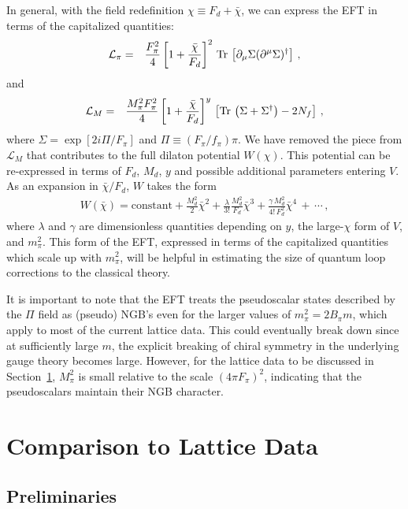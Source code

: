\documentclass[a4paper,11pt]{article}
\newcommand{\beqs}{\begin{eqnarray}}
\newcommand{\eeqs}{\end{eqnarray}}
\newcommand{\Tr}{{\rm Tr}}
\def\Tr{{\rm Tr \,}}                                    %
\begin{document}
In general, with the field redefinition $\chi \equiv F_d + \bar{\chi}$, we can express the EFT in terms of the capitalized quantities:
\beqs 
{\cal L}_{\pi}&=&\frac{F_{\pi}^2}{4}\left[ 1+ \frac{\bar{\chi}}{F_{d}}\right]^2 \,\Tr\left[\partial_\mu \Sigma (\partial^{\mu} \Sigma)^{\dagger}\right]\,,
\label{Eq:LpiR} 
\eeqs
and
\beqs
{\cal L}_M&=&\frac{M_{\pi}^{2}F_{\pi}^2}{4}\left[1+ \frac{\bar{\chi}}{F_{d}}\right]^y\, \left[\Tr \left(\Sigma + \Sigma^{\dagger}\right) - 2N_f \right] \,,\label{Eq:LMR}
\eeqs
where $\Sigma=\exp\left[2i \Pi/F_{\pi} \right]$ and $\Pi\equiv(F_\pi/f_\pi)\pi$. We have removed the piece from $\mathcal{L}_M$ that contributes to the full dilaton potential $W(\chi)$. This potential can be re-expressed in terms of $F_d$, $M_d$, $y$ and possible additional parameters entering $V$. As an expansion in $\bar{\chi} / F_d$, $W$  takes the form 
\beqs
W(\bar{\chi}) = \text{constant} + \frac{M_d^2}{2} \bar{\chi}^2 + \frac{\lambda}{3!} \frac{M_d^2}{F_d} \bar{\chi}^3 + \frac{\gamma \, M_d^2}{4!\,F_d^2}\bar{\chi}^4\,+\,\cdots \,,
\label{Eq:Wexpansion}
\eeqs
where $\lambda$ and $\gamma$ are dimensionless quantities depending on $y$, the large-$\chi$ form of $V$, and $m_{\pi}^2$. This form of the EFT, expressed in terms of the capitalized quantities which scale up with $m_{\pi}^2$, will be helpful in estimating the size of quantum loop corrections to the classical theory.

It is important to note that the EFT treats the pseudoscalar states described by the $\Pi$ field as (pseudo) NGB's even for the larger values of $m_{\pi}^2 = 2B_{\pi} m $, which apply to most of the current lattice data. This could eventually break down since at sufficiently large $m$, the explicit breaking of chiral symmetry in the underlying gauge theory becomes large. However, for the lattice data to be discussed in Section~\ref{Sec:Lattice}, $M_{\pi}^2$ is small relative to the scale $(4\pi F_\pi)^2$, indicating that the pseudoscalars maintain their NGB character.



\section{Comparison to Lattice Data} 
\label{Sec:Lattice}

\subsection{Preliminaries} 
\end{document}
